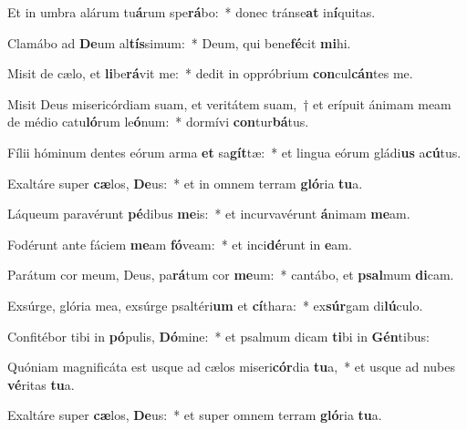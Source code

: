 \item Et in umbra alárum tu\textbf{á}rum spe\textbf{rá}bo:~* donec tránse\textbf{at} in\textbf{í}quitas.
\item Clamábo ad \textbf{De}um al\textbf{tís}simum:~* Deum, qui bene\textbf{fé}cit \textbf{mi}hi.
\item Misit de cælo, et \textbf{li}be\textbf{rá}vit me:~* dedit in oppróbrium \textbf{con}cul\textbf{cán}tes me.
\item Misit Deus misericórdiam suam, et veritátem suam,~† et erípuit ánimam meam de médio catu\textbf{ló}rum le\textbf{ó}num:~* dormívi \textbf{con}tur\textbf{bá}tus.
\item Fílii hóminum dentes eórum arma \textbf{et} sa\textbf{gít}tæ:~* et lingua eórum gládi\textbf{us} a\textbf{cú}tus.
\item Exaltáre super \textbf{cæ}los, \textbf{De}us:~* et in omnem terram \textbf{gló}ria \textbf{tu}a.
\item Láqueum paravérunt \textbf{pé}dibus \textbf{me}is:~* et incurvavérunt \textbf{á}nimam \textbf{me}am.
\item Fodérunt ante fáciem \textbf{me}am \textbf{fó}veam:~* et inci\textbf{dé}runt in \textbf{e}am.
\item Parátum cor meum, Deus, pa\textbf{rá}tum cor \textbf{me}um:~* cantábo, et \textbf{psal}mum \textbf{di}cam.
\item Exsúrge, glória mea, exsúrge psaltéri\textbf{um} et \textbf{cí}thara:~* ex\textbf{súr}gam di\textbf{lú}culo.
\item Confitébor tibi in \textbf{pó}pulis, \textbf{Dó}mine:~* et psalmum dicam \textbf{ti}bi in \textbf{Gén}tibus:
\item Quóniam magnificáta est usque ad cælos miseri\textbf{cór}dia \textbf{tu}a,~* et usque ad nubes \textbf{vé}ritas \textbf{tu}a.
\item Exaltáre super \textbf{cæ}los, \textbf{De}us:~* et super omnem terram \textbf{gló}ria \textbf{tu}a.
